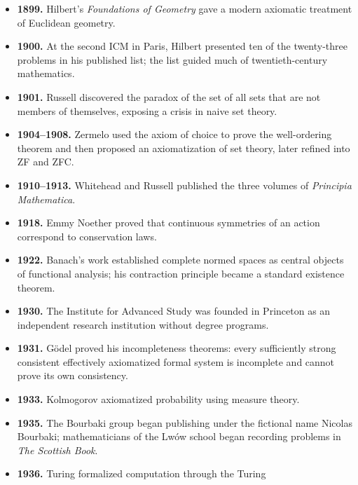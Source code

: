 \begin{itemize}
              proved the prime number theorem,
              \[
                  \pi(x)\sim\frac{x}{\ln x}.
              \]
        \item \textbf{1899.} Hilbert's
              \textit{Foundations of Geometry} gave a modern axiomatic treatment
              of Euclidean geometry.
        \item \textbf{1900.} At the second ICM in Paris, Hilbert presented ten
              of the twenty-three problems in his published list; the list
              guided much of twentieth-century mathematics.
        \item \textbf{1901.} Russell discovered the paradox of the set of all
              sets that are not members of themselves, exposing a crisis in
              naive set theory.
        \item \textbf{1904--1908.} Zermelo used the axiom of choice to prove the
              well-ordering theorem and then proposed an axiomatization of set
              theory, later refined into ZF and ZFC.
        \item \textbf{1910--1913.} Whitehead and Russell published the three
              volumes of \textit{Principia Mathematica}.
        \item \textbf{1918.} Emmy Noether proved that continuous symmetries of
              an action correspond to conservation laws.
        \item \textbf{1922.} Banach's work established complete normed spaces
              as central objects of functional analysis; his contraction
              principle became a standard existence theorem.
        \item \textbf{1930.} The Institute for Advanced Study was founded in
              Princeton as an independent research institution without degree
              programs.
        \item \textbf{1931.} Gödel proved his incompleteness theorems: every
              sufficiently strong consistent effectively axiomatized formal
              system is incomplete and cannot prove its own consistency.
        \item \textbf{1933.} Kolmogorov axiomatized probability using measure
              theory.
        \item \textbf{1935.} The Bourbaki group began publishing under the
              fictional name Nicolas Bourbaki; mathematicians of the Lwów
              school began recording problems in \textit{The Scottish Book}.
        \item \textbf{1936.} Turing formalized computation through the Turing

\end{itemize}
